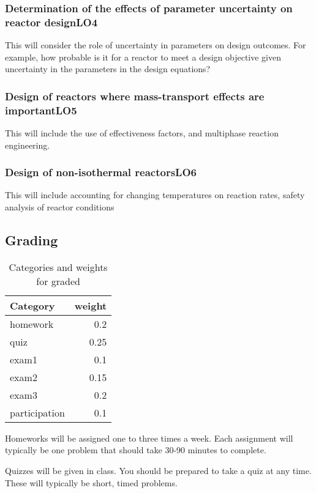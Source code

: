 \documentclass[11pt]{article}
\begin{document}
\subsubsection{Determination of the effects of parameter uncertainty on reactor design\hfill{}\textsc{LO4}}
\label{sec:orgheadline5}
This will consider the role of uncertainty in parameters on design outcomes. For example, how probable is it for a reactor to meet a design objective given uncertainty in the parameters in the design equations?

\subsubsection{Design of reactors where mass-transport effects are important\hfill{}\textsc{LO5}}
\label{sec:orgheadline6}
This will include the use of effectiveness factors, and multiphase reaction engineering.

\subsubsection{Design of non-isothermal reactors\hfill{}\textsc{LO6}}
\label{sec:orgheadline7}
This will include accounting for changing temperatures on reaction rates, safety analysis of reactor conditions


\subsection{Grading}
\label{sec:orgheadline10}

\begin{table}[htb]
\caption{\label{categories}
Categories and weights for graded}
\centering
\begin{tabular}{lr}
Category & weight\\
\hline
homework & 0.2\\
quiz & 0.25\\
exam1 & 0.1\\
exam2 & 0.15\\
exam3 & 0.2\\
participation & 0.1\\
\end{tabular}
\end{table}

Homeworks will be assigned one to three times a week. Each assignment will typically be one problem that should take 30-90 minutes to complete.

Quizzes will be given in class. You should be prepared to take a quiz at any time. These will typically be short, timed problems.
\end{document}
